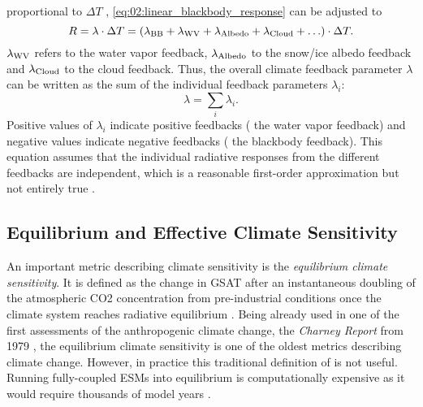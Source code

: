 proportional to $\Delta T$ \autocite{Gregory2008a},
\cref{eq:02:linear_blackbody_response} can be adjusted to
\begin{equation}
  R = \lambda \cdot \Delta T = \left( \lambda_{\textnormal{BB}} +
  \lambda_{\textnormal{WV}} + \lambda_{\textnormal{Albedo}} + \lambda_{\textnormal{Cloud}} +
  \ldots \right) \cdot \Delta T.
  \label{eq:02:linear_response}
\end{equation}
$\lambda_{\textnormal{WV}}$ refers to the water vapor feedback,
$\lambda_{\textnormal{Albedo}}$ to the snow/ice albedo feedback and
$\lambda_{\textnormal{Cloud}}$ to the cloud feedback. Thus, the overall climate
feedback parameter $\lambda$ can be written as the sum of the individual
feedback parameters $\lambda_i$:
\begin{equation}
  \lambda = \sum_i \lambda_i.
  \label{eq:02:lambda_as_sum_of_lambdas}
\end{equation}
Positive values of $\lambda_i$ indicate positive feedbacks (\eg{} the water
vapor feedback) and negative values indicate negative feedbacks (\eg{} the
blackbody feedback). This equation assumes that the individual radiative
responses from the different feedbacks are independent, which is a reasonable
first-order approximation but not entirely true \autocite{Soden2008}.

\subsection{Equilibrium and Effective Climate Sensitivity}
\label{subsec:02:ecs}

An important metric describing climate sensitivity is the \emph{equilibrium
  climate sensitivity}. It is defined as the change in \ac{GSAT} after an
instantaneous doubling of the atmospheric \ac{CO2} concentration from
pre-industrial conditions once the climate system reaches radiative equilibrium
\autocite{Bindoff2013}. Being already used in one of the first assessments of
the anthropogenic climate change, the \emph{Charney Report} from 1979
\autocite{Charney1979}, the equilibrium climate sensitivity is one of the
oldest metrics describing climate change. However, in practice this traditional
definition of is not useful. Running fully-coupled \acp{ESM} into equilibrium
is computationally expensive as it would require thousands of model years
\autocite{Rugenstein2020}.

